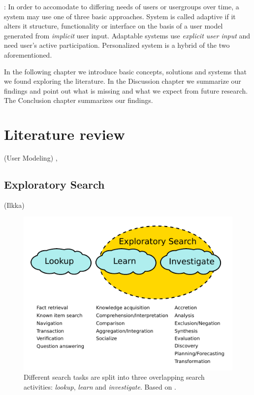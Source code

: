 \documentclass{sigchi}
\begin{document}
\cite{van08}: 
In order to accomodate to differing needs of users or usergroups over time, a system may use one of three basic approaches. System is called adaptive if it alters it structure, functionality or interface on the basis of a user model generated from \textit{implicit} user input. Adaptable systems use \textit{explicit user input} and need user's active participation. Personalized system is a hybrid of the two aforementioned.

In the following chapter we introduce basic concepts, solutions and systems that we found exploring the literature. 
In the Discussion chapter we summarize our findings and point out what is missing and what we expect from future research. 
The Conclusion chapter summarizes our findings.


\section{Literature review}
\label{sec:litreview}

(User Modeling) \cite{rich99}, \cite{fischer01}

\subsection{Exploratory Search}
(Ilkka)

\begin{figure}[htp] %
\caption{Different search tasks are split into three overlapping search activities: \textit{lookup}, \textit{learn} and \textit{investigate}. Based on \protect\cite{march06}.}
\label{figure_3clouds}
\centering
\includegraphics[scale=1.5]{figures/3clouds.pdf}
\end{figure}
\end{document}
